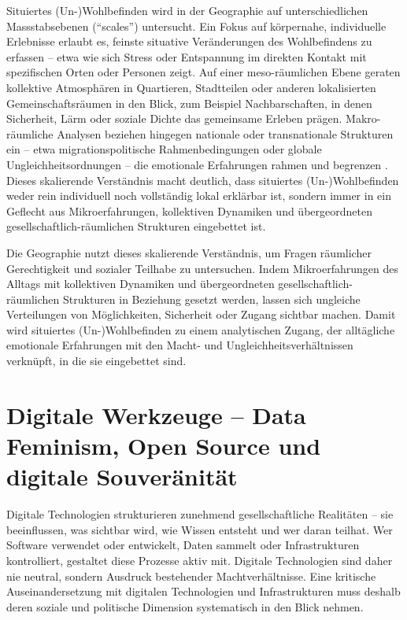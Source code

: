 Situiertes (Un\nobreakdash-)Wohl\-be\-find\-en wird in der Geographie auf unterschiedlichen Massstabsebenen (\enquote{scales}) untersucht. Ein Fokus auf körpernahe, individuelle Erlebnisse erlaubt es, feinste situative Veränderungen des Wohlbefindens zu erfassen -- etwa wie sich Stress oder Entspannung im direkten Kontakt mit spezifischen Orten oder Personen zeigt. Auf einer meso-räumlichen Ebene geraten kollektive Atmosphären in Quartieren, Stadtteilen oder anderen lokalisierten Gemeinschaftsräumen in den Blick, zum Beispiel Nachbarschaften, in denen Sicherheit, Lärm oder soziale Dichte das gemeinsame Erleben prägen. Makro-räumliche Analysen beziehen hingegen nationale oder transnationale Strukturen ein -- etwa migrationspolitische Rahmenbedingungen oder globale Ungleichheitsordnungen -- die emotionale Erfahrungen rahmen und begrenzen \parencite{howittScaleRelationMusical1998,marstonHumanGeographyScale2005}. Dieses skalierende Verständnis macht deutlich, dass situiertes (Un\nobreakdash-)Wohl\-be\-find\-en weder rein individuell noch vollständig lokal erklärbar ist, sondern immer in ein Geflecht aus Mikroerfahrungen, kollektiven Dynamiken und übergeordneten gesellschaftlich-räumlichen Strukturen eingebettet ist.

Die Geographie nutzt dieses skalierende Verständnis, um Fragen räumlicher Gerechtigkeit und sozialer Teilhabe zu untersuchen. Indem Mikroerfahrungen des Alltags mit kollektiven Dynamiken und übergeordneten gesellschaftlich-räumlichen Strukturen in Beziehung gesetzt werden, lassen sich ungleiche Verteilungen von Möglichkeiten, Sicherheit oder Zugang sichtbar machen. Damit wird situiertes (Un\nobreakdash-)Wohl\-be\-find\-en zu einem analytischen Zugang, der alltägliche emotionale Erfahrungen mit den Macht- und Ungleichheitsverhältnissen verknüpft, in die sie eingebettet sind.

\section{Digitale Werkzeuge -- Data Feminism, Open Source und digitale Souveränität}
\label{sec:datafeminism}

Digitale Technologien strukturieren zunehmend gesellschaftliche Realitäten -- sie beeinflussen, was sichtbar wird, wie Wissen entsteht und wer daran teilhat. Wer Software verwendet oder entwickelt, Daten sammelt oder Infrastrukturen kontrolliert, gestaltet diese Prozesse aktiv mit. Digitale Technologien sind daher nie neutral, sondern Ausdruck bestehender Machtverhältnisse. Eine kritische Auseinandersetzung mit digitalen Technologien und Infrastrukturen muss deshalb deren soziale und politische Dimension systematisch in den Blick nehmen.

